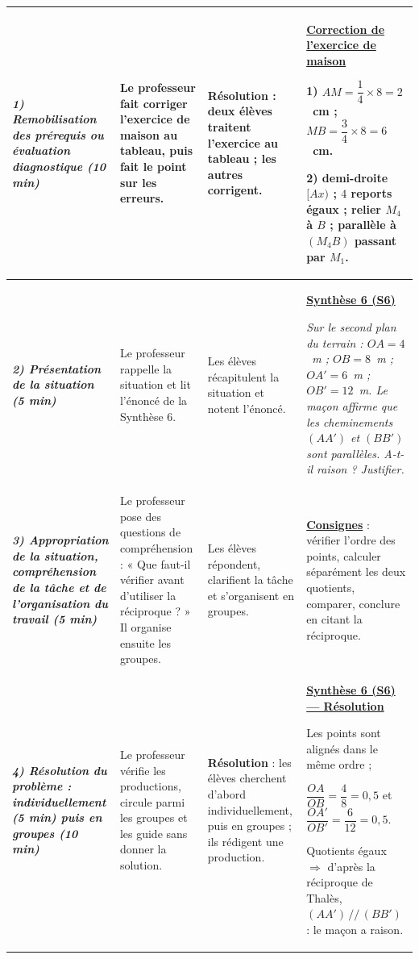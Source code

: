 \documentclass[10pt]{article}
\newcommand{\titreR}[1]{\underline{\textcolor{rougetitre}{\bfseries #1}}}
\newcommand{\seance}[1]{\fcolorbox{bleuseance}{bleufond}{\textcolor{bleuseance}{\bfseries #1}}}
\newcommand{\moment}[1]{\textbf{\itshape #1}}
\newcommand{\mclef}[1]{\colorbox{jaunesurl}{#1}}
\begin{document}
\begin{longtable}{|p{2.35cm}|p{5.35cm}|p{4.55cm}|p{13.85cm}|}
\hline
\seance{SEANCE 6} \newline \moment{1) Remobilisation des prérequis ou évaluation diagnostique (10 min)} &
Le professeur fait corriger l'exercice de maison au tableau, puis fait le point sur les erreurs. &
\textbf{Résolution} : deux élèves traitent l'exercice au tableau ; les autres corrigent. &
\titreR{Correction de l'exercice de maison} \par
\textbf{1)} $AM=\dfrac{1}{4}\times8=2$~cm ; $MB=\dfrac{3}{4}\times8=6$~cm. \par
\textbf{2)} demi-droite $[Ax)$ ; $4$ reports égaux ; relier $M_4$ à $B$ ; parallèle
à $(M_4B)$ passant par $M_1$. \\ \hline

\moment{2) Présentation de la situation (5 min)} &
Le professeur rappelle la situation  et lit l'énoncé de la Synthèse 6. &
Les élèves récapitulent la situation et notent l'énoncé. &
\titreR{Synthèse 6 (S6)} \par
{\itshape Sur le second plan du terrain : $OA=4$~m ; $OB=8$~m ; $OA'=6$~m ;
$OB'=12$~m. Le maçon affirme que les cheminements $(AA')$ et $(BB')$ sont
parallèles. A-t-il raison ? Justifier.} \\ \hline

\moment{3) Appropriation de la situation, compréhension de la tâche et de
l'organisation du travail (5 min)} &
Le professeur pose des questions de compréhension : « Que faut-il vérifier avant d'utiliser la réciproque ? » Il organise ensuite les groupes. &
Les élèves répondent, clarifient la tâche et s'organisent en groupes. &
\titreR{Consignes} : vérifier l'ordre des points, calculer séparément les deux
quotients, comparer, conclure en citant la réciproque. \\ \hline

\moment{4) Résolution du problème : individuellement (5 min) puis en groupes (10 min)} &
Le professeur vérifie les productions, circule parmi les groupes et les guide sans donner la solution. &
\textbf{Résolution} : les élèves cherchent d'abord individuellement, puis en groupes ; ils rédigent une production. &
\titreR{Synthèse 6 (S6) — Résolution} \par
Les points sont alignés dans le même ordre ; \par
$\dfrac{OA}{OB}=\dfrac{4}{8}=0{,}5$ et $\dfrac{OA'}{OB'}=\dfrac{6}{12}=0{,}5$. \par
Quotients égaux $\Rightarrow$ d'après la \mclef{réciproque de Thalès},
$(AA')\,//\,(BB')$ : le maçon a raison. \\ \hline


\end{longtable}
\end{document}
